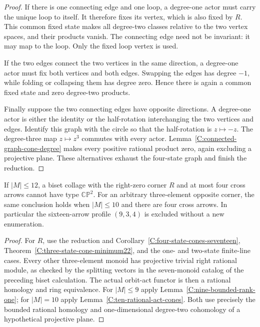 \begin{proof}
If there is one connecting edge and one loop, a degree-one
actor must carry the unique loop to itself.  It therefore fixes
its vertex, which is also fixed by $R$.  This common fixed state
makes all degree-two classes relative to the two vertex spaces,
and their products vanish.  The connecting edge need not be
invariant: it may map to the loop.  Only the fixed loop vertex
is used.

If the two edges connect the two vertices in the same direction,
a degree-one actor must fix both vertices and both edges.
Swapping the edges has degree $-1$, while folding or collapsing
them has degree zero.  Hence there is again a common fixed
state and zero degree-two products.

Finally suppose the two connecting edges have opposite directions.
A degree-one actor is either the identity or the half-rotation
interchanging the two vertices and edges.  Identify this graph
with the circle so that the half-rotation is $z\mapsto-z$.
The degree-three map $z\mapsto z^3$ commutes with every actor.
Lemma~\ref{C:connected-graph-cone-degree} makes every positive
rational product zero, again excluding a projective plane.
These alternatives exhaust the four-state graph and finish
the reduction.
\end{proof}

\begin{corollary}\label{C:right-zero-four-state-bounds}
If $|M|\leq12$, a biset collage with the right-zero corner $R$
and at most four cross arrows cannot have type $\mathbb{CP}^2$.
For an arbitrary three-element opposite corner, the same
conclusion holds when $|M|\leq10$ and there are four cross arrows.
In particular the sixteen-arrow profile $(9,3,4)$ is excluded
without a new enumeration.
\end{corollary}
\begin{proof}
For $R$, use the reduction and
Corollary~\ref{C:four-state-cones-seventeen},
Theorem~\ref{C:three-state-cone-minimum22}, and the one- and
two-state finite-line cases.
Every other three-element monoid has projective trivial right
rational module, as checked by the splitting vectors in the
seven-monoid catalog of the preceding biset calculation.  The actual
orbit-act functor is then a rational homology and ring
equivalence.  For $|M|\leq9$ apply
Lemma~\ref{C:nine-bounded-rank-one}; for $|M|=10$ apply
Lemma~\ref{C:ten-rational-act-cones}.  Both use precisely the
bounded rational homology and one-dimensional degree-two
cohomology of a hypothetical projective plane.
\end{proof}
